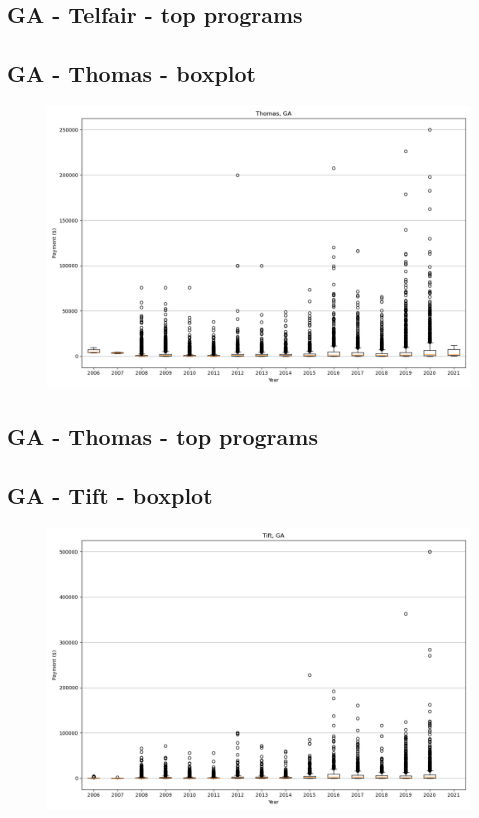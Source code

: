 \subsection*{GA - Telfair - top programs}

\newpage
\subsection*{GA - Thomas - boxplot}
\begin{figure}[h]
\centering
\includegraphics[width=7in]{../output/boxplots/counties/Thomas-GA_boxplot.png}
\end{figure}


\subsection*{GA - Thomas - top programs}

\newpage
\subsection*{GA - Tift - boxplot}
\begin{figure}[h]
\centering
\includegraphics[width=7in]{../output/boxplots/counties/Tift-GA_boxplot.png}
\end{figure}


